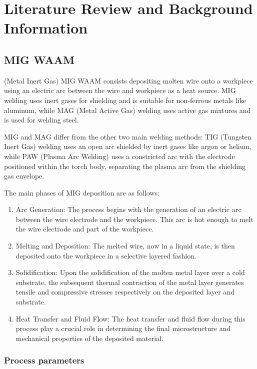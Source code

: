 \section{Literature Review and Background Information}

\subsection{MIG WAAM}

(Metal Inert Gas) MIG WAAM consists depositing molten wire onto a workpiece using an electric arc between the wire and workpiece as a heat source. MIG welding uses inert gases for shielding and is suitable for non-ferrous metals like aluminum, while MAG (Metal Active Gas) welding uses active gas mixtures and is used for welding steel.

MIG and MAG differ from the other two main welding methods: TIG (Tungsten Inert Gas) welding uses an open arc shielded by inert gases like argon or helium, while PAW (Plasma Arc Welding) uses a constricted arc with the electrode positioned within the torch body, separating the plasma arc from the shielding gas envelope.

The main phases of MIG deposition are as follows:

\begin{enumerate}
    \item Arc Generation: The process begins with the generation of an electric arc between the wire electrode and the workpiece. This arc is hot enough to melt the wire electrode and part of the workpiece.
    \item Melting and Deposition: The melted wire, now in a liquid state, is then deposited onto the workpiece in a selective layered fashion.
    \item Solidification: Upon the solidification of the molten metal layer over a cold substrate, the subsequent thermal contraction of the metal layer generates tensile and compressive stresses respectively on the deposited layer and substrate.
    \item Heat Transfer and Fluid Flow: The heat transfer and fluid flow during this process play a crucial role in determining the final microstructure and mechanical properties of the deposited material.
\end{enumerate}

\subsubsection{Process parameters}

